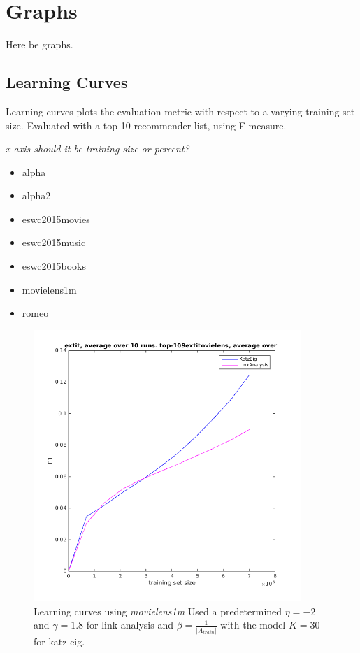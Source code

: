 \chapter{Graphs}\label{cha:graphs}

Here be graphs.

\section{Learning Curves}\label{sec:learning_curves}

Learning curves plots the evaluation metric with respect to a varying training set size. Evaluated with a top-10 recommender list, using F-measure.

\textit{x-axis should it be training size or percent?}

\begin{itemize}
    \item alpha
    \item alpha2
    \item eswc2015movies
    \item eswc2015music
    \item eswc2015books
    \item movielens1m
    \item romeo
\end{itemize}



\begin{figure}[ht]
  \centering
    \includegraphics[width=0.9\textwidth]{fig/learning_curves/movielens_learning_curves.png}
    \caption{Learning curves using \textit{movielens1m}
        Used a predetermined $\eta = -2$ and $\gamma = 1.8$ for link-analysis and $\beta = \frac{1}{|A_{train}|}$ with the model $K = 30$ for katz-eig.}
\end{figure}

